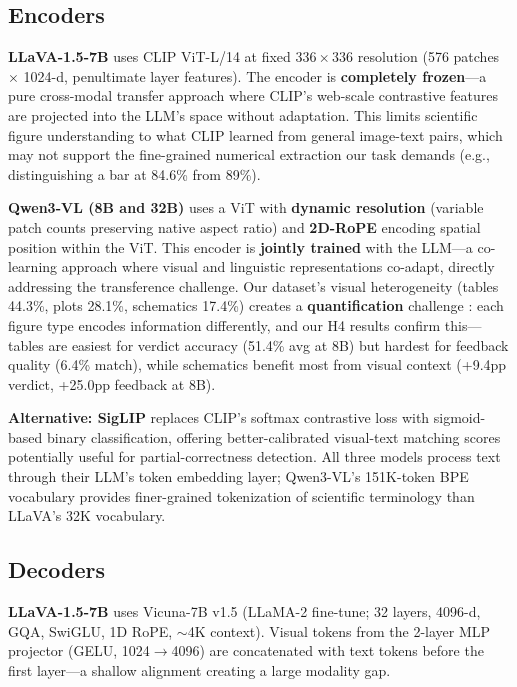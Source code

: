 \subsection{ Encoders}

\textbf{LLaVA-1.5-7B} uses CLIP ViT-L/14 at fixed $336{\times}336$ resolution (576 patches $\times$ 1024-d, penultimate layer features). The encoder is \textbf{completely frozen}---a pure cross-modal transfer approach where CLIP's web-scale contrastive features are projected into the LLM's space without adaptation. This limits scientific figure understanding to what CLIP learned from general image-text pairs, which may not support the fine-grained numerical extraction our task demands (e.g., distinguishing a bar at 84.6\% from 89\%).

\textbf{Qwen3-VL (8B and 32B)} uses a ViT with \textbf{dynamic resolution} (variable patch counts preserving native aspect ratio) and \textbf{2D-RoPE} encoding spatial position within the ViT. This encoder is \textbf{jointly trained} with the LLM---a co-learning approach where visual and linguistic representations co-adapt, directly addressing the transference challenge. Our dataset's visual heterogeneity (tables 44.3\%, plots 28.1\%, schematics 17.4\%) creates a \textbf{quantification} challenge \citep{Liang-foundations-2024}: each figure type encodes information differently, and our H4 results confirm this---tables are easiest for verdict accuracy (51.4\% avg at 8B) but hardest for feedback quality (6.4\% match), while schematics benefit most from visual context (+9.4pp verdict, +25.0pp feedback at 8B).

\textbf{Alternative: SigLIP} replaces CLIP's softmax contrastive loss with sigmoid-based binary classification, offering better-calibrated visual-text matching scores potentially useful for partial-correctness detection. All three models process text through their LLM's token embedding layer; Qwen3-VL's 151K-token BPE vocabulary provides finer-grained tokenization of scientific terminology than LLaVA's 32K vocabulary.

\subsection{ Decoders}

\textbf{LLaVA-1.5-7B} uses Vicuna-7B v1.5 (LLaMA-2 fine-tune; 32 layers, 4096-d, GQA, SwiGLU, 1D RoPE, ${\sim}$4K context). Visual tokens from the 2-layer MLP projector (GELU, 1024$\rightarrow$4096) are concatenated with text tokens before the first layer---a shallow alignment creating a large modality gap.

